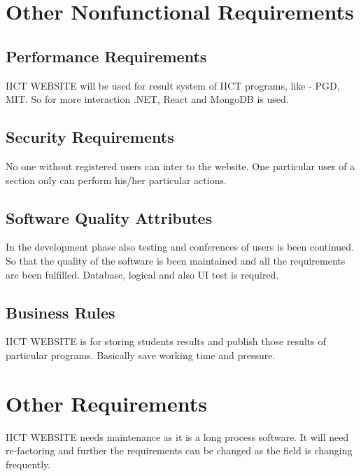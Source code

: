 \documentclass{scrreprt}
\begin{document}
\chapter{Other Nonfunctional Requirements}

\section{Performance Requirements}
IICT WEBSITE will be used for result system of IICT programs, like - PGD, MIT. So for more interaction .NET, React and MongoDB is used. 

\section{Security Requirements}
No one without registered users can inter to the website. One particular user of a section only can perform his/her particular actions. 

\section{Software Quality Attributes}
In the development phase also testing and conferences of users is been continued. So that the quality of the software is been maintained and all the requirements are been fulfilled.
\newline
Database, logical and also UI test is required. 

\section{Business Rules}
IICT WEBSITE is for storing students results and publish those results of particular programs.
\newline
Basically save working time and pressure. 


\chapter{Other Requirements}
IICT WEBSITE needs maintenance as it is a long process software. It will need re-factoring and further the requirements can be changed as the field is changing frequently. 
\end{document}
